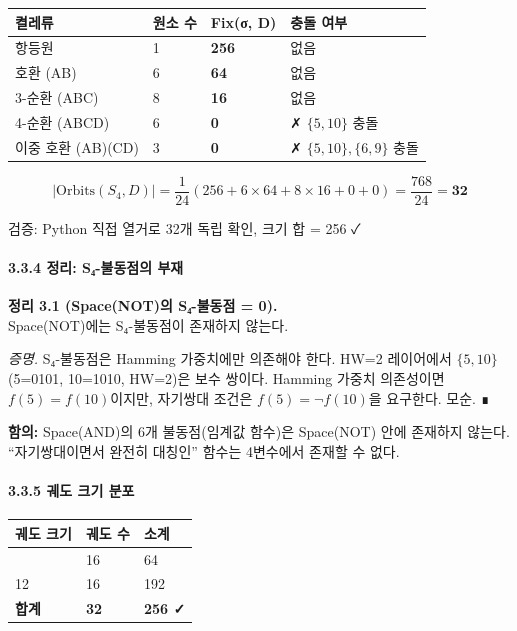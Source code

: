 \documentclass[
]{article}
\newcounter{none} %
\begin{document}
{\def\LTcaptype{none} %
\begin{longtable}[]{@{}llll@{}}
\toprule\noalign{}
켤레류 & 원소 수 & Fix(σ, D) & 충돌 여부 \\
\midrule\noalign{}
\endhead
\bottomrule\noalign{}
\endlastfoot
항등원 & 1 & \textbf{256} & 없음 \\
호환 (AB) & 6 & \textbf{64} & 없음 \\
3-순환 (ABC) & 8 & \textbf{16} & 없음 \\
4-순환 (ABCD) & 6 & \textbf{0} & ✗ \(\{5,10\}\) 충돌 \\
이중 호환 (AB)(CD) & 3 & \textbf{0} & ✗ \(\{5,10\}, \{6,9\}\) 충돌 \\
\end{longtable}
}

\[|\text{Orbits}(S_4, D)| = \frac{1}{24}(256 + 6 \times 64 + 8 \times 16 + 0 + 0) = \frac{768}{24} = \mathbf{32}\]

검증: Python 직접 열거로 32개 독립 확인, 크기 합 = 256 ✓

\paragraph{3.3.4 정리: S₄-불동점의
부재}\label{uxc815uxb9ac-sux2084-uxbd88uxb3d9uxc810uxc758-uxbd80uxc7ac}

\textbf{정리 3.1 (Space(NOT)의 S₄-불동점 = 0).}\\
Space(NOT)에는 S₄-불동점이 존재하지 않는다.

\emph{증명.} S₄-불동점은 Hamming 가중치에만 의존해야 한다. HW=2
레이어에서 \(\{5, 10\}\) (5=0101, 10=1010, HW=2)은 보수 쌍이다. Hamming
가중치 의존성이면 \(f(5) = f(10)\)이지만, 자기쌍대 조건은
\(f(5) = \neg f(10)\)을 요구한다. 모순. ∎

\textbf{함의:} Space(AND)의 6개 불동점(임계값 함수)은 Space(NOT) 안에
존재하지 않는다. ``자기쌍대이면서 완전히 대칭인'' 함수는 4변수에서
존재할 수 없다.

\paragraph{3.3.5 궤도 크기
분포}\label{uxada4uxb3c4-uxd06cuxae30-uxbd84uxd3ec-1}

{\def\LTcaptype{none} %
\begin{longtable}[]{@{}lll@{}}
\toprule\noalign{}
궤도 크기 & 궤도 수 & 소계 \\
\midrule\noalign{}
\endhead
\bottomrule\noalign{}
\endlastfoot
4 & 16 & 64 \\
12 & 16 & 192 \\
\textbf{합계} & \textbf{32} & \textbf{256 ✓} \\
\end{longtable}
}
\end{document}
